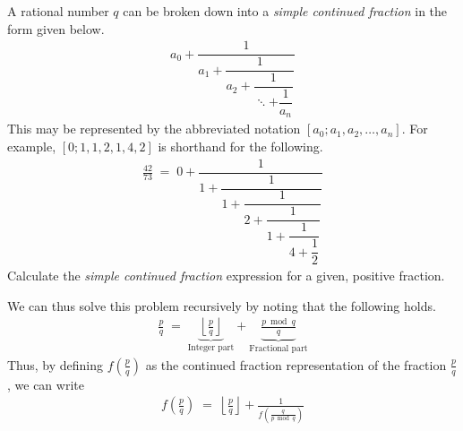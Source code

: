 
\problem A rational number $q$ can be broken down into a \textit{simple continued fraction} in the form given below.
\begin{align*}
	a_0 + \dfrac{1}{a_1 + \dfrac{1}{a_2 + \dfrac{1}{\ddots + \dfrac{1}{a_n}}}}
\end{align*}
This may be represented by the abbreviated notation $[a_0; a_1, a_2, \dots, a_n]$. For example, $[0; 1, 1, 2, 1, 4, 2]$ is shorthand for the following.
\begin{align*}
	\frac{42}{73} \;=\; 0 + \dfrac{1}{1 + \dfrac{1}{1 + \dfrac{1}{2 + \dfrac{1}{1 + \dfrac{1}{4 + \dfrac{1}{2}}}}}}
\end{align*}
Calculate the \textit{simple continued fraction} expression for a given, positive fraction.

\solution
We can thus solve this problem recursively by noting that the following holds.
\begin{align*}
	\frac{p}{q} \;=\;\!\!\! \underbrace{\left\lfloor \frac{p}{q} \right\rfloor}_{\text{Integer part}} 
			\!\!\!	+ \underbrace{\frac{p \bmod q}{q}}_{\text{Fractional part}}
\end{align*}
Thus, by defining $f(\frac{p}{q})$ as the continued fraction representation of the fraction $\frac{p}{q}$, we can write
\begin{align*}
	f \left( \frac{p}{q} \right) \;=\; \left\lfloor \frac{p}{q} \right\rfloor + \frac{1}{f \left( \frac{q}{p \bmod q} \right)}
\end{align*}
